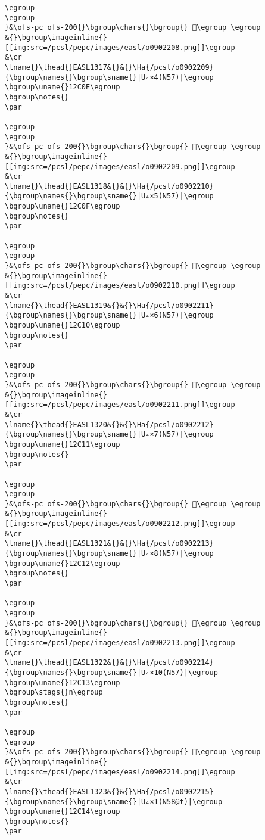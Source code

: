 \begin{verbatim}
\egroup
\egroup
}&\ofs-pc ofs-200{}\bgroup\chars{}\bgroup{} 𒰍\egroup \egroup
&{}\bgroup\imageinline{}[[img:src=/pcsl/pepc/images/easl/o0902208.png]]\egroup
&\cr
\lname{}\thead{}EASL1317&{}&{}\Ha{/pcsl/o0902209}{\bgroup\names{}\bgroup\sname{}|U₄×4(N57)|\egroup
\bgroup\uname{}12C0E\egroup
\bgroup\notes{}
\par 

\egroup
\egroup
}&\ofs-pc ofs-200{}\bgroup\chars{}\bgroup{} 𒰎\egroup \egroup
&{}\bgroup\imageinline{}[[img:src=/pcsl/pepc/images/easl/o0902209.png]]\egroup
&\cr
\lname{}\thead{}EASL1318&{}&{}\Ha{/pcsl/o0902210}{\bgroup\names{}\bgroup\sname{}|U₄×5(N57)|\egroup
\bgroup\uname{}12C0F\egroup
\bgroup\notes{}
\par 

\egroup
\egroup
}&\ofs-pc ofs-200{}\bgroup\chars{}\bgroup{} 𒰏\egroup \egroup
&{}\bgroup\imageinline{}[[img:src=/pcsl/pepc/images/easl/o0902210.png]]\egroup
&\cr
\lname{}\thead{}EASL1319&{}&{}\Ha{/pcsl/o0902211}{\bgroup\names{}\bgroup\sname{}|U₄×6(N57)|\egroup
\bgroup\uname{}12C10\egroup
\bgroup\notes{}
\par 

\egroup
\egroup
}&\ofs-pc ofs-200{}\bgroup\chars{}\bgroup{} 𒰐\egroup \egroup
&{}\bgroup\imageinline{}[[img:src=/pcsl/pepc/images/easl/o0902211.png]]\egroup
&\cr
\lname{}\thead{}EASL1320&{}&{}\Ha{/pcsl/o0902212}{\bgroup\names{}\bgroup\sname{}|U₄×7(N57)|\egroup
\bgroup\uname{}12C11\egroup
\bgroup\notes{}
\par 

\egroup
\egroup
}&\ofs-pc ofs-200{}\bgroup\chars{}\bgroup{} 𒰑\egroup \egroup
&{}\bgroup\imageinline{}[[img:src=/pcsl/pepc/images/easl/o0902212.png]]\egroup
&\cr
\lname{}\thead{}EASL1321&{}&{}\Ha{/pcsl/o0902213}{\bgroup\names{}\bgroup\sname{}|U₄×8(N57)|\egroup
\bgroup\uname{}12C12\egroup
\bgroup\notes{}
\par 

\egroup
\egroup
}&\ofs-pc ofs-200{}\bgroup\chars{}\bgroup{} 𒰒\egroup \egroup
&{}\bgroup\imageinline{}[[img:src=/pcsl/pepc/images/easl/o0902213.png]]\egroup
&\cr
\lname{}\thead{}EASL1322&{}&{}\Ha{/pcsl/o0902214}{\bgroup\names{}\bgroup\sname{}|U₄×10(N57)|\egroup
\bgroup\uname{}12C13\egroup
\bgroup\stags{}n\egroup
\bgroup\notes{}
\par 

\egroup
\egroup
}&\ofs-pc ofs-200{}\bgroup\chars{}\bgroup{} 𒰓\egroup \egroup
&{}\bgroup\imageinline{}[[img:src=/pcsl/pepc/images/easl/o0902214.png]]\egroup
&\cr
\lname{}\thead{}EASL1323&{}&{}\Ha{/pcsl/o0902215}{\bgroup\names{}\bgroup\sname{}|U₄×1(N58@t)|\egroup
\bgroup\uname{}12C14\egroup
\bgroup\notes{}
\par 


\end{verbatim}
